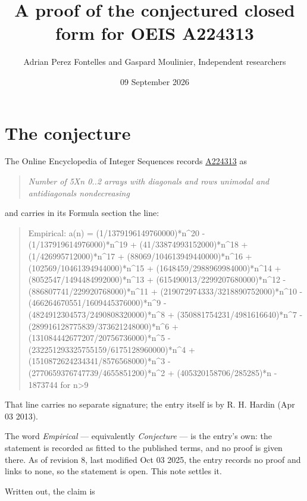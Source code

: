 \documentclass[11pt]{article}
\title{A proof of the conjectured closed form for OEIS A224313}
\author{Adrian Perez Fontelles and Gaspard Moulinier, Independent researchers}
\date{09 September 2026}
\theoremstyle{definition}
\begin{document}
\maketitle
\section{The conjecture}

The Online Encyclopedia of Integer Sequences records \href{https://oeis.org/A224313}{A224313} as

\begin{quote}\itshape Number of 5Xn 0..2 arrays with diagonals and rows unimodal and antidiagonals nondecreasing\end{quote}

and carries in its Formula section the line:

\begin{quote}\ttfamily Empirical: a(n) = (1/1379196149760000)*n\textasciicircum{}20 - (1/137919614976000)*n\textasciicircum{}19 + (41/33874993152000)*n\textasciicircum{}18 + (1/426995712000)*n\textasciicircum{}17 + (88069/104613949440000)*n\textasciicircum{}16 + (102569/10461394944000)*n\textasciicircum{}15 + (1648459/2988969984000)*n\textasciicircum{}14 + (8052547/1494484992000)*n\textasciicircum{}13 + (615490013/2299207680000)*n\textasciicircum{}12 - (886807741/229920768000)*n\textasciicircum{}11 + (219072974333/3218890752000)*n\textasciicircum{}10 - (466264670551/1609445376000)*n\textasciicircum{}9 - (4824912304573/2490808320000)*n\textasciicircum{}8 + (350881754231/4981616640)*n\textasciicircum{}7 - (289916128775839/373621248000)*n\textasciicircum{}6 + (131084442677207/20756736000)*n\textasciicircum{}5 - (232251293325755159/6175128960000)*n\textasciicircum{}4 + (1510872624234341/8576568000)*n\textasciicircum{}3 - (2770659376747739/4655851200)*n\textasciicircum{}2 + (405320158706/285285)*n - 1873744 for n>9\end{quote}

That line carries no separate signature; the entry itself is by R. H. Hardin (Apr 03 2013).

The word {\itshape Empirical} --- equivalently {\itshape Conjecture} --- is the entry's own: the statement is recorded as fitted to the published terms, and no proof is given there. As of revision 8, last modified Oct 03 2025, the entry records no proof and links to none, so the statement is open. This note settles it.

Written out, the claim is
\end{document}
